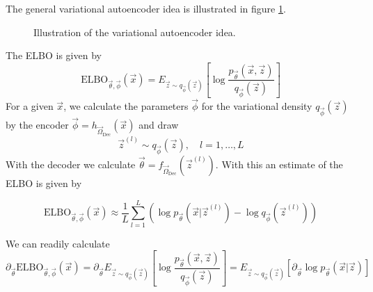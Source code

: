 The general variational autoencoder idea is illustrated in figure \ref{fig:vae}.

\begin{figure}[!htb]
    \centering
    
    \caption{Illustration of the variational autoencoder idea.}
    \label{fig:vae}
\end{figure}

The ELBO is given by
\begin{equation}
    \text{ELBO}_{\vec{\theta}, \vec{\phi}}(\vec{x}) = E_{\vec{z} \sim q_{\vec{\phi}}(\vec{z})} \left[ \log \frac{p_\vec{\theta}(\vec{x},\vec{z})}{q_{\vec{\phi}}(\vec{z})} \right]
\end{equation}
For a given $\vec{x}$, we calculate the parameters $\vec{\phi}$ for the variational density $q_{\vec{\phi}}(\vec{z})$ by the encoder
${\vec{\phi}} = h_{\vec{\Omega}_{\text{Dec}}}(\vec{x})$ and draw
\begin{equation}
    \vec{z}^{(l)} \sim q_{\vec{\phi}}(\vec{z}), \quad l = 1,\dots,L
\end{equation}
With the decoder we calculate $\vec{\theta} = f_{\vec{\Omega}_{\text{Dec}}}(\vec{z}^{(l)})$. With this 
an estimate of the ELBO is given by

\begin{equation}
    \text{ELBO}_{\vec{\theta}, \vec{\phi}}(\vec{x}) \approx \frac{1}{L} \sum_{l=1}^{L} \left(\log p_{\vec{\theta}}(\vec{x}|\vec{z}^{(l)}) - \log q_{\vec{\phi}}(\vec{z}^{(l)})\right)
\end{equation}


We can readily calculate
\begin{equation}
    \partial_\vec{\theta} \text{ELBO}_{\vec{\theta}, \vec{\phi}}(\vec{x}) = \partial_\vec{\theta} E_{\vec{z} \sim q_{\vec{\phi}}(\vec{z})} \left[ \log \frac{p_\vec{\theta}(\vec{x},\vec{z})}{q_{\vec{\phi}}(\vec{z})} \right] = E_{\vec{z} \sim q_{\vec{\phi}}(\vec{z})} \left[ \partial_\vec{\theta} \log p_\vec{\theta}(\vec{x}|\vec{z}) \right]
\end{equation}


